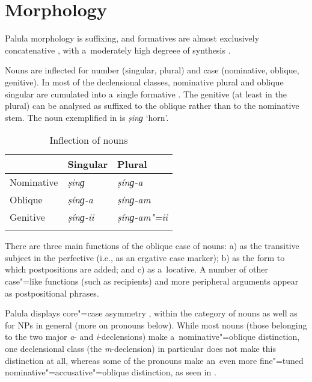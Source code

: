 \section{Morphology}
\label{sec:2-2}

Palula morphology is suffixing, and formatives are almost exclusively concatenative \citep{bickel_fusion_2013}, with a~moderately high degreee of synthesis \citep{bickel_inflectional_2013}. 


Nouns are inflected for number (singular, plural) and case (nominative, oblique, genitive). In most of the declensional classes, nominative plural and oblique singular are cumulated into a~single formative \citep{bickel_exponence_2013}. The genitive (at least in the plural) can be analysed as suffixed to the oblique rather than to the nominative stem. The noun exemplified in  is \textit{ṣinɡ} `horn'.

\begin{table}[ht]
\caption{Inflection of nouns}
\begin{tabularx}{\textwidth}{ Q Q Q }
\lsptoprule
&
Singular &
Plural
\\\hline
Nominative &
\textit{ṣinɡ} &
\textit{ṣínɡ-a}\\
Oblique &
\textit{ṣínɡ-a} &
\textit{ṣínɡ-am}\\ 
Genitive &
\textit{ṣínɡ-ii} &
\textit{ṣínɡ-am"=ii}
\\\lspbottomrule
\end{tabularx}
\label{tab:2-nouns}
\end{table}


There are three main functions of the oblique case of nouns: a) as the transitive subject in the perfective (i.e., as an ergative case marker); b) as the form to which postpositions are added; and c) as a~locative. A number of other case"=like functions (such as recipients) and more peripheral arguments appear as postpositional phrases.


Palula displays core"=case asymmetry \citep{iggesen_asymmetrical_2013}, within the category of nouns as well as for NPs in general (more on pronouns below). While most nouns (those belonging to the two major \textit{a}- and \textit{i}-declensions) make a~nominative"=oblique distinction, one declensional class (the \textit{m}-declension) in particular does not make this distinction at all, whereas some of the pronouns make an~even more fine"=tuned nominative"=accusative"=oblique distinction, as seen in .


